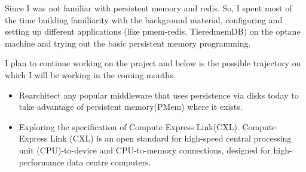 \documentclass[11pt,swedish, openany, oneside]{book}
\begin{document}
Since I was not familiar with persistent memory and redis. So, I spent most of the time building
familiarity with the background material, configuring and setting up different applications (like pmem-redis, TieredmemDB) on the optane machine and trying out the basic persistent memory programming.

I plan to continue working on the project and below is the possible trajectory on which I will be working in the coming months.
\begin{itemize}
    \item Rearchitect any popular middleware that uses persistence via disks today to take advantage of persistent memory(PMem) where it exists.
    \item Exploring the specification of Compute Express Link(CXL). Compute Express Link (CXL) is an open standard for high-speed central processing unit (CPU)-to-device and CPU-to-memory connections, designed for high-performance data centre computers.
\end{itemize}


\vspace{0.2cm}



\end{document}
